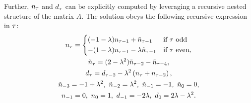 Further, $ n_{\tau} $ and $ d_{\tau} $ can be explicitly computed %
by leveraging a recursive nested structure of the matrix $ A $.
The solution obeys the following recursive expression in $ \tau $:
\begin{subequations}\label{eq:disc-time-single-int-variance-explicit}
	\begin{gather}
		n_\delayn = \begin{dcases}
			(-1-\gpos)n_{\delayn-1} + \tilde{n}_{\delayn-1} & \mbox{if } \delayn \mbox{ odd}\\
			-(1-\gpos)n_{\delayn-1} - \gpos\tilde{n}_{\delayn-1} & \mbox{if }\delayn \mbox{ even},\\
		\end{dcases} \label{eq:disc-time-single-int-variance-explicit-numerator}\\
		\tilde{n}_{\delayn} = (2-\gpos^2)\tilde{n}_{\delayn-2} - \tilde{n}_{\delayn-4}, \label{eq:disc-time-single-int-variance-explicit-numerator-rem}\\
		d_\delayn = d_{\delayn-2} - \gpos^2\left(n_\delayn+n_{\delayn-2}\right), \label{eq:disc-time-single-int-variance-explicit-denominator}\\
		\tilde{n}_{-3} = -1+\gpos^2, \ \tilde{n}_{-2} = \gpos^2, \ \tilde{n}_{-1} = -1, \ \tilde{n}_0 = 0, \\
		n_{-1} = 0, \ n_0 = 1, \ d_{-1} = -2\gpos, \ d_0 = 2\gpos-\gpos^2.
	\end{gather}
\end{subequations}
